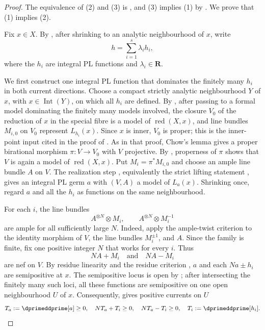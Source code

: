 \begin{proof}
The equivalence of (2) and (3) is
\cite[Proposition~7.1]{GJR26}, and (3) implies (1) by
\cite[Theorem~7.14]{GJR26}.  We prove that (1) implies (2).

Fix \(x\in X\).  By \cite[Proposition~5.8 and Lemma~5.10]{GJR26}, after
shrinking to an analytic neighbourhood of \(x\), write
\begin{equation}
\label{eq:p01-real-pl-decomposition}
                         h=\sum_{i=1}^{s}\lambda_i h_i,
\end{equation}
where the \(h_i\) are integral PL functions and
\(\lambda_i\in\mathbf R\).

We first construct one integral PL function that dominates the finitely
many \(h_i\) in both current directions.  Choose a compact strictly analytic
neighbourhood \(Y\) of \(x\), with \(x\in\operatorname{Int}(Y)\), on which all
\(h_i\) are defined.  By \cite[Corollary~5.9 and \S6.16]{GJR26}, after passing
to a formal model dominating the finitely many models involved, the closure
\(V_0\) of the reduction of \(x\) in the special fibre is a model of
\(\operatorname{red}(X,x)\), and line bundles \(M_{i,0}\) on \(V_0\) represent
\(L_{h_i}(x)\).  Since \(x\) is inner, \(V_0\) is proper; this is the inner-point
input cited in the proof of \cite[Proposition~7.10]{GJR26}.  As in that
proof, Chow's lemma gives a proper birational morphism
\(\pi:V\to V_0\) with \(V\) projective.  By \cite[\S6.2]{GJR26}, properness of
\(\pi\) shows that \(V\) is again a model of \(\operatorname{red}(X,x)\).  Put
\(M_i=\pi^*M_{i,0}\) and choose an ample line bundle \(A\) on \(V\).  The
realization step \cite[\S6.6.5]{CLD12}, equivalently the strict lifting
statement \cite[Theorem~17.5.7(b)]{CLD25}, gives an integral PL germ \(a\)
with \((V,A)\) a model of \(L_a(x)\).  Shrinking once, regard \(a\) and all the
\(h_i\) as functions on the same neighbourhood.

For each \(i\), the line bundles
\[
                         A^{\otimes N}\otimes M_i,
             \qquad     A^{\otimes N}\otimes M_i^{-1}
\]
are ample for all sufficiently large \(N\).  Indeed, apply the ample-twist
criterion \cite[Tag~0892]{stacks-project} to the identity morphism of \(V\),
the line bundles \(M_i^{\pm1}\), and \(A\).  Since the family is finite, fix one
positive integer \(N\) that works for every \(i\).  Thus
\begin{equation}
\label{eq:p01-ample-domination-residues}
                       NA+M_i\quad\text{and}\quad NA-M_i
\end{equation}
are nef on \(V\).  By residue linearity \cite[Lemma~6.18]{GJR26} and the
residue criterion \cite[Proposition~7.1]{GJR26}, \(a\) and each \(Na\pm h_i\)
are semipositive at \(x\).  The semipositive locus is open by
\cite[Remark~7.3(4)]{GJR26}; after intersecting the finitely many such loci,
all these functions are semipositive on one open neighbourhood \(U\) of \(x\).
Consequently, \cite[Theorem~7.14]{GJR26} gives positive currents on \(U\)
\begin{equation}
\label{eq:p01-current-domination}
 T_a:=\dprimeddprime[a]\geq0,
 \qquad NT_a+T_i\geq0,
 \qquad NT_a-T_i\geq0,
 \qquad T_i:=\dprimeddprime[h_i].
\end{equation}


\end{proof}
